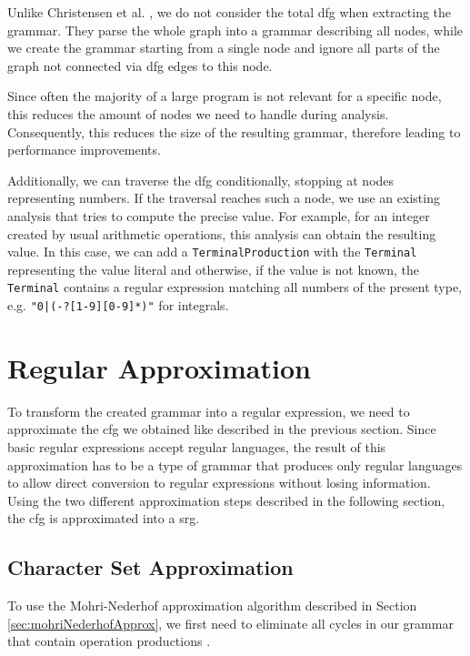 Unlike Christensen et al. \cite{brics}, we do not consider the total \ac{dfg} when extracting the grammar. They parse the whole graph into a grammar describing all nodes, while we create the grammar starting from a single node and ignore all parts of the graph not connected via \ac{dfg} edges to this node.

Since often the majority of a large program is not relevant for a specific node, this reduces the amount of nodes we need to handle during analysis. Consequently, this reduces the size of the resulting grammar, therefore leading to performance improvements.

Additionally, we can traverse the \ac{dfg} conditionally, stopping at nodes representing numbers. If the traversal reaches such a node, we use an existing analysis that tries to compute the precise value.
For example, for an integer created by usual arithmetic operations, this analysis can obtain the resulting value.
In this case, we can add a \lstinline|TerminalProduction| with the \lstinline|Terminal| representing the value literal and otherwise, if the value is not known, the \lstinline|Terminal| contains a regular expression matching all numbers of the present type, e.g. \lstinline{"0|(-?[1-9][0-9]*)"} for integrals.
	

\section{Regular Approximation}\label{sec:approximation}

To transform the created grammar into a regular expression, we need to approximate the \ac{cfg} we obtained like described in the previous section. Since basic regular expressions accept regular languages, the result of this approximation has to be a type of grammar that produces only regular languages to allow direct conversion to regular expressions without losing information. Using the two different approximation steps described in the following section, the \ac{cfg} is approximated into a \acl{srg}.

\subsection{Character Set Approximation}\label{sec:charsetApprox}
To use the Mohri-Nederhof approximation algorithm described in Section \ref{sec:mohriNederhofApprox}, we first need to eliminate all cycles in our grammar that contain operation productions \cite{mohri_nederhof}.

